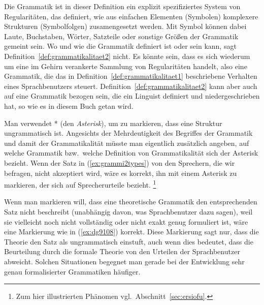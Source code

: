 Die Grammatik ist in dieser Definition ein explizit spezifiziertes System von Regularitäten, das definiert, wie aus einfachen Elementen (Symbolen) komplexere Strukturen (Symbolfolgen) zusamengesetzt werden.
Mit Symbol können dabei Laute, Buchstaben, Wörter, Satzteile oder sonstige Größen der Grammatik gemeint sein.
Wo und wie die Grammatik definiert ist oder sein kann, sagt Definition~\ref{def:grammatikalitaet2} nicht.
Es könnte sein, dass es sich wiederum um eine im Gehirn verankerte Sammlung von Regularitäten handelt, also eine Grammatik, die das in Definition~\ref{def:grammatikalitaet1} beschriebene Verhalten eines Sprachbenutzers steuert.
Definition~\ref{def:grammatikalitaet2} kann aber auch auf eine Grammatik bezogen sein, die ein Linguist definiert und niedergeschrieben hat, so wie es in diesem Buch getan wird.

Man verwendet * (den \textit{Asterisk}), um zu markieren, dass eine Struktur ungrammatisch ist.
Angesichts der Mehrdeutigkeit des Begriffes der Grammatik und damit der Grammatikalität müsste man eigentlich zusätzlich angeben, auf welche Grammatik bzw.\ welche Definition von Grammatikalität sich der Asterisk bezieht.
Wenn der Satz in (\ref{ex:grammi2types}) von den Sprechern, die wir befragen, nicht akzeptiert wird, wäre es korrekt, ihn mit einem Asterisk zu markieren, der sich auf Sprecherurteile bezieht.%
\footnote{Zum hier illustrierten Phänomen vgl.\ Abschnitt~\ref{sec:ersiofu}.}

\begin{exe}
  \ex\label{ex:grammi2types}
  \begin{xlist}
  \end{xlist}
\end{exe}

Wenn man markieren will, dass eine theoretische Grammatik den entsprechenden Satz nicht beschreibt (unabhängig davon, was Sprachbenutzer dazu sagen), weil sie vielleicht noch nicht vollständig oder nicht exakt genug formuliert ist, wäre eine Markierung wie in (\ref{ex:dg9108}) korrekt.
Diese Markierung sagt nur, dass die Theorie den Satz als ungrammatisch einstuft, auch wenn dies bedeutet, dass die Beurteilung durch die formale Theorie von den Urteilen der Sprachbenutzer abweicht.
Solchen Situationen begegnet man gerade bei der Entwicklung sehr genau formalisierter Grammatiken häufiger.

\begin{exe}
\end{exe}

